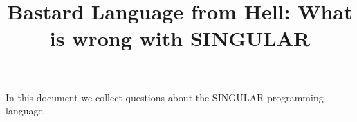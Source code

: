 \documentclass[a4paper]{article}
\title{Bastard Language from Hell: What is wrong with SINGULAR}
\begin{document}
In this document we collect questions about the SINGULAR programming
language. 
\end{document}
